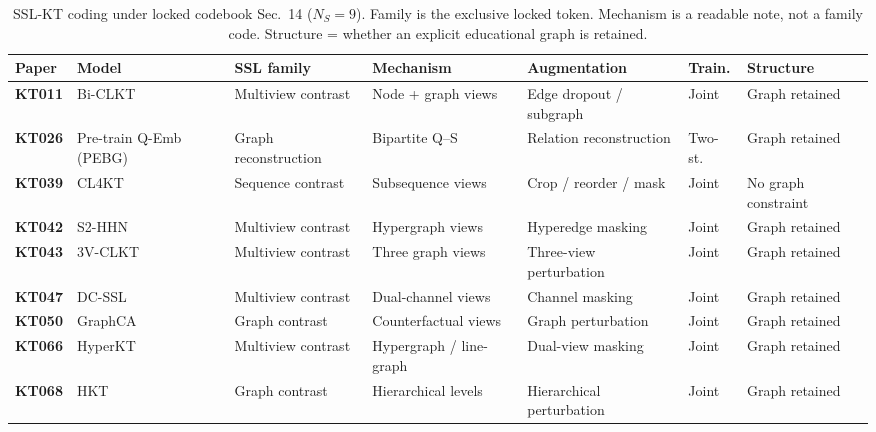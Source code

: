 \documentclass[lettersize,journal]{IEEEtran}
\begin{document}
\begin{table}[t]
\caption{SSL-KT coding under locked codebook Sec.~14 ($N_S=9$). Family is the exclusive locked token. Mechanism is a readable note, not a family code. Structure = whether an explicit educational graph is retained.}
\label{tab:ssl_taxonomy}
\centering
\footnotesize
\setlength{\tabcolsep}{3.0pt}
\begin{tabular}{@{}l>{\raggedright\arraybackslash}p{2.15cm}>{\raggedright\arraybackslash}p{1.85cm}>{\raggedright\arraybackslash}p{1.85cm}>{\raggedright\arraybackslash}p{2.05cm}l>{\raggedright\arraybackslash}p{1.45cm}@{}}
\toprule
\textbf{Paper} & \textbf{Model} & \textbf{SSL family} & \textbf{Mechanism} & \textbf{Augmentation} & \textbf{Train.} & \textbf{Structure} \\
\midrule
\textbf{KT011} & Bi-CLKT \cite{KT011_BiCLKT_2022} & Multiview contrast & Node + graph views & Edge dropout / subgraph & Joint & Graph retained \\
\textbf{KT026} & Pre-train Q-Emb (PEBG) \cite{KT026_PretrainQ_2020} & Graph reconstruction & Bipartite Q--S & Relation reconstruction & Two-st. & Graph retained \\
\textbf{KT039} & CL4KT \cite{KT039_CL4KT_2022} & Sequence contrast & Subsequence views & Crop / reorder / mask & Joint & No graph constraint \\
\textbf{KT042} & S2-HHN \cite{KT042_S2HHN_2023} & Multiview contrast & Hypergraph views & Hyperedge masking & Joint & Graph retained \\
\textbf{KT043} & 3V-CLKT \cite{KT043_3VCLKT_2024} & Multiview contrast & Three graph views & Three-view perturbation & Joint & Graph retained \\
\textbf{KT047} & DC-SSL \cite{KT047_DCSSL_2023} & Multiview contrast & Dual-channel views & Channel masking & Joint & Graph retained \\
\textbf{KT050} & GraphCA \cite{KT050_GraphCA_2023} & Graph contrast & Counterfactual views & Graph perturbation & Joint & Graph retained \\
\textbf{KT066} & HyperKT \cite{KT066_HyperKT_2025} & Multiview contrast & Hypergraph / line-graph & Dual-view masking & Joint & Graph retained \\
\textbf{KT068} & HKT \cite{KT068_HKT_2025} & Graph contrast & Hierarchical levels & Hierarchical perturbation & Joint & Graph retained \\
\bottomrule
\end{tabular}
\end{table}
\end{document}
